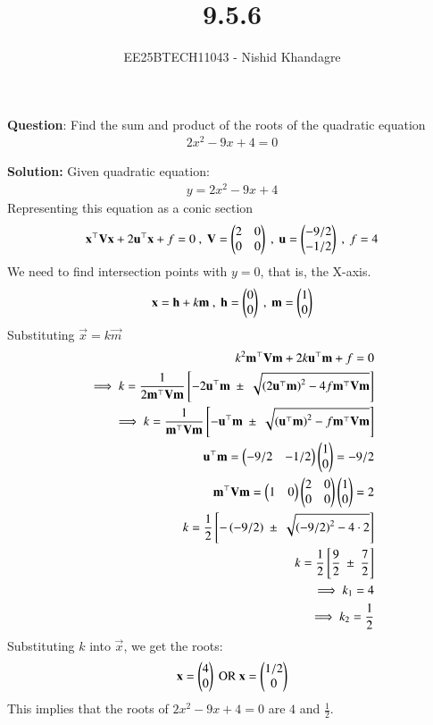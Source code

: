 \documentclass[journal]{IEEEtran}
\title{9.5.6}
\author{EE25BTECH11043 - Nishid Khandagre}
\begin{document}
\maketitle

\renewcommand{\thefigure}{\theenumi}
\renewcommand{\thetable}{\theenumi}


\textbf{Question}:
Find the sum and product of the roots of the quadratic equation 
\begin{align*}
2x^2-9x + 4 = 0
\end{align*}

\textbf{Solution:}
Given quadratic equation:
\begin{align}
    y=2x^2 - 9x + 4
\end{align}
Representing this equation as a conic section
\begin{align}
    \mathbf{x}^{\top}\mathbf{V}\mathbf{x} + 2\mathbf{u}^{\top}\mathbf{x} + f=0 \ , \  \mathbf{V}=\begin{pmatrix}2 & 0\\0&0\end{pmatrix} \ , \  \mathbf{u}=\begin{pmatrix}-9/2 \\ -1/2\end{pmatrix} \ ,\ f=4
\end{align}
We need to find intersection points with $y=0$, that is, the X-axis.
\begin{align}
    \vec{x}=\vec{h} + k \vec{m} \ , \ \vec{h}=\myvec{0 \\ 0} \ , \ \vec{m}=\myvec{1 \\ 0}
\end{align}
Substituting $\vec{x} = k \vec{m}$
\begin{align}
    k^2\mathbf{m}^{\top}\mathbf{V}\mathbf{m} + 2k\mathbf{u}^{\top}\mathbf{m} + f=0 \\
    \implies k= \dfrac{1}{2 \mathbf{m}^{\top}\mathbf{V}\mathbf{m}} {}\left[ -2\mathbf{u}^{\top}\mathbf{m} \ \pm \ \sqrt{\left(2\mathbf{u}^{\top}\mathbf{m}\right)^2 - 4 f \mathbf{m}^{\top}\mathbf{V}\mathbf{m}}\right]\\
    \implies k= \dfrac{1}{\mathbf{m}^{\top}\mathbf{V}\mathbf{m}} {}\left[ -\mathbf{u}^{\top}\mathbf{m} \ \pm \ \sqrt{\left(\mathbf{u}^{\top}\mathbf{m}\right)^2-f \mathbf{m}^{\top}\mathbf{V}\mathbf{m}}\right]\\
    \mathbf{u}^{\top}\mathbf{m} = \begin{pmatrix}-9/2 & -1/2\end{pmatrix}\begin{pmatrix}1 \\0\end{pmatrix} = -9/2 \\
    \mathbf{m}^{\top}\mathbf{V}\mathbf{m}=\begin{pmatrix}1 & 0\end{pmatrix}\begin{pmatrix}2 & 0\\0&0\end{pmatrix}\begin{pmatrix}1 \\ 0\end{pmatrix} = 2\\
    k= \dfrac{1}{2} {}\left[ -\left(-9/2\right) \ \pm \ \sqrt{ \left(-9/2\right)^2 - 4 \cdot 2}\right]\\
    k= \dfrac{1}{2} {}\left[ \dfrac{9}{2} \ \pm \ \dfrac{7}{2}\right]\\
    \implies k_1= 4\\
    \implies k_2= \dfrac{1}{2}
\end{align}
Substituting $k$ into $\vec{x}$, we get the roots:
\begin{align}
    \mathbf{x} = \begin{pmatrix}4 \\ 0\end{pmatrix} \text{ OR } \mathbf{x}=\begin{pmatrix}1/2 \\ 0\end{pmatrix}
\end{align}
This implies that the roots of $2x^2 -9x + 4 =0$ are $4$ and $\frac{1}{2}$.
\end{document}
